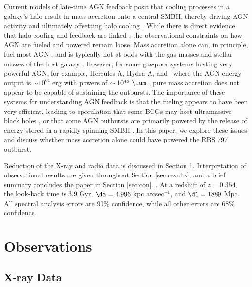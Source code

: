 \documentclass[11pt, preprint]{aastex}
\begin{document}
Current models of late-time AGN feedback posit that cooling processes
in a galaxy's halo result in mass accretion onto a central SMBH,
thereby driving AGN activity and ultimately offsetting halo cooling
\citep[\eg][]{croton06, bower06, sijacki07}. While there is direct
evidence that halo cooling and feedback are linked
\citep[\eg][]{haradent, rafferty08}, the observational constraints on
how AGN are fueled and powered remain loose. Mass accretion alone can,
in principle, fuel most AGN \citep[\eg][]{pizzolato05,
  2006MNRAS.372...21A}, and is typically not at odds with the gas
masses and stellar masses of the host galaxy
\citep[\eg][]{rafferty06}. However, for some gas-poor systems hosting
very powerful AGN, for example, Hercules A, Hydra A, and \ms\ where
the AGN energy output is $\sim 10^{61}$ erg with powers of $\sim
10^{45} ~\lum$ \citep{herca, hydraa, ms0735}, pure mass accretion does
not appear to be capable of sustaining the outbursts. The importance
of these systems for understanding AGN feedback is that the fueling
appears to have been very efficient, leading to speculation that some
BCGs may host ultramassive black holes \citep[$> 10^{10} ~\msol$;
  \eg][]{msspin}, or that some AGN outbursts are primarily powered by
the release of energy stored in a rapidly spinning SMBH
\citep[\eg][]{minaspin}. In this paper, we explore these issues and
discuss whether mass accretion alone could have powered the RBS 797
outburst.

Reduction of the X-ray and radio data is discussed in Section
\ref{sec:obs}. Interpretation of observational results are given
throughout Section \ref{sec:results}, and a brief summary concludes
the paper in Section \ref{sec:con}. \LCDM. At a redshift of $z =
0.354$, the look-back time is 3.9 Gyr, $\da = 4.996$ kpc
arcsec$^{-1}$, and $\dl = 1889$ Mpc. All spectral analysis errors are
90\% confidence, while all other errors are 68\% confidence.

\section{Observations}
\label{sec:obs}

\subsection{X-ray Data}
\label{sec:xray}
\end{document}
